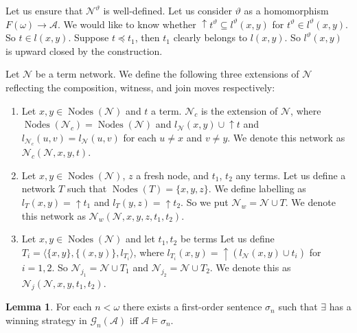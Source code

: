 \documentclass[a4paper]{article}
\theoremstyle{definition}
\theoremstyle{theorem}
\theoremstyle{proposition}
\theoremstyle{lemma}
\newtheorem{lemma}{Lemma}
\theoremstyle{ex}
\theoremstyle{corollary}
\theoremstyle{claim}
\begin{document}
Let us ensure that $\mathcal{N}^{\vartheta}$ is well-defined. Let us consider $\vartheta$ as a homomorphism $F(\omega) \to \mathcal{A}$. We would like to know whether ${\uparrow t^{\vartheta}} \subseteq l^{\vartheta}(x,y)$ for $t^{\vartheta} \in l^{\vartheta}(x,y)$. So $t \in l(x,y)$. Suppose $t \preceq t_1$, then $t_1$ clearly belongs to $l(x,y)$. So $l^{\vartheta}(x,y)$ is upward closed by the construction.

Let $\mathcal{N}$ be a term network. We define the following three extensions of $\mathcal{N}$ reflecting the composition, witness, and join moves respectively:
\begin{enumerate}
  \item Let $x, y \in \operatorname{Nodes}(\mathcal{N})$ and $t$ a term. $\mathcal{N}_c$ is the extension of $\mathcal{N}$,
  where $\operatorname{Nodes}(\mathcal{N}_c) = \operatorname{Nodes}(\mathcal{N})$ and $l_{\mathcal{N}}(x, y) \cup {\uparrow t}$ and $l_{\mathcal{N}_c}(u, v) = l_{\mathcal{N}}(u, v)$ for each $u \neq x$ and $v \neq y$. We denote this network as $\mathcal{N}_c(\mathcal{N}, x, y, t)$.
  \item
  Let $x, y \in \operatorname{Nodes}(\mathcal{N})$, $z$ a fresh node, and $t_1$, $t_2$ any terms. Let us define a network $T$ such that $\operatorname{Nodes}(T) = \{ x, y, z\}$. We define labelling as $l_{T}(x, y) = {\uparrow t_1}$ and $l_{T}(y, z) = {\uparrow t_2}$. So we put $\mathcal{N}_w = \mathcal{N} \cup T$.
  We denote this network as $\mathcal{N}_w(\mathcal{N}, x,y,z, t_1, t_2)$.
  \item Let $x, y \in \operatorname{Nodes}(\mathcal{N})$ and let $t_1, t_2$ be terms
  Let us define $T_i = \langle \{ x, y\}, \{ (x, y) \}, l_{T_i} \rangle$, where $l_{T_i}(x, y) = \uparrow (l_{\mathcal{N}}(x, y) \cup t_i)$ for $i = 1,2$. So $\mathcal{N}_{j_1} = \mathcal{N} \cup T_1$ and $\mathcal{N}_{j_2} = \mathcal{N} \cup T_2$.
  We denote this as $\mathcal{N}_j(\mathcal{N}, x, y, t_1, t_2)$.
\end{enumerate}

\begin{lemma}\label{ax}
  For each $n < \omega$ there exists a first-order sentence $\sigma_n$ such that $\exists$ has a winning strategy in $\mathcal{G}_n(\mathcal{A})$ iff $\mathcal{A} \models \sigma_n$.
\end{lemma}
\end{document}
